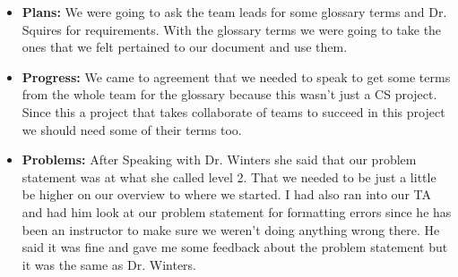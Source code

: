 \documentclass[10pt,draftclsnofoot,onecolumn]{IEEEtran}
\begin{document}
\begin{itemize}
	\item \textbf{Plans: }We were going to ask the team leads for some glossary terms and Dr. Squires for requirements. With the glossary terms we were going to take the ones that we felt pertained to our document and use them.
	\item \textbf{Progress: } We came to agreement that we needed to speak to get some terms from the whole team for the glossary because this wasn't just a CS project. Since this a project that takes collaborate of teams to succeed in this project we should need some of their terms too.
	\item \textbf{Problems: }After Speaking with Dr. Winters she said that our problem statement was at what she called level 2. That we needed to be just a little be higher on our overview to where we started. I had also ran into our TA and had him look at our problem statement for formatting errors since he has been an instructor to make sure we weren't doing anything wrong there. He said it was fine and gave me some feedback about the problem statement but it was the same as Dr. Winters.
\end{itemize}
\end{document}
